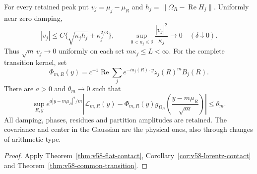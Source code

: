 \begin{leadtheorem}
\label{thm:intro-v58-contact}
For every retained peak put $v_j=\mu_j-\mu_R$ and
$h_j=\|\Omega_R-\operatorname{Re}H_j\|$. Uniformly near zero damping,
\[
 |v_j|\le C\{\sqrt{\kappa_jh_j}+\kappa_j^{2/3}\},\qquad
 \sup_{0<\kappa_j\le\delta}\frac{|v_j|^2}{\kappa_j}\longrightarrow0
                 \quad(\delta\downarrow0).
\]
Thus $\sqrt m\,v_j\to0$ uniformly on each set $m\kappa_j\le L<\infty$.
For the complete transition kernel, set
\[
 \Phi_{m,R}(y)=c^{-1}\operatorname{Re}
             \sum_j e^{-ia_j(R)\cdot y}z_j(R)^mB_j(R).
\]
There are $a>0$ and $\theta_m\to0$ such that
\[
 \sup_{R,y}e^{a|y-m\mu_R|^2/m}
 \left|\mathcal L_{m,R}(y)-\Phi_{m,R}(y)
           g_{\Omega_R}\left(\frac{y-m\mu_R}{\sqrt m}\right)\right|
                                                      \le\theta_m.
\]
All damping, phases, residues and partition amplitudes are retained.
The covariance and center in the Gaussian are the physical ones,
also through changes of arithmetic type.
\end{leadtheorem}
\begin{proof}
Apply Theorem~\ref{thm:v58-flat-contact},
Corollary~\ref{cor:v58-lorentz-contact} and
Theorem~\ref{thm:v58-common-transition}.
\end{proof}

